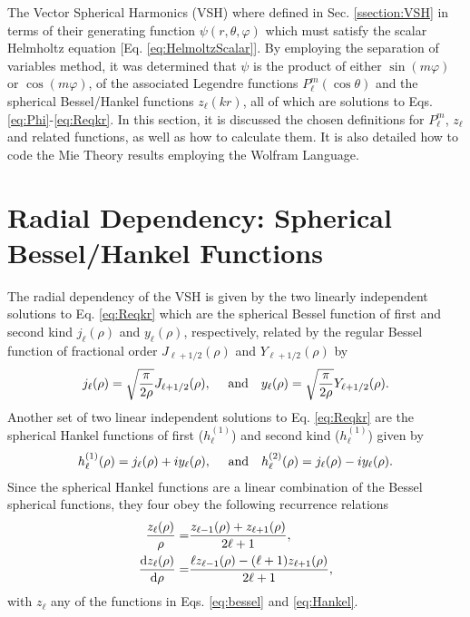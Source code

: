 
The Vector Spherical Harmonics (VSH) where defined in Sec. \ref{ssection:VSH} in terms of their generating function $\psi(r,\theta,\varphi)$ which must satisfy the scalar Helmholtz equation [Eq.  \eqref{eq:HelmoltzScalar}]. By employing the separation of variables method,  it was determined that $\psi$ is the product of either $\sin(m\varphi)$ or $\cos(m\varphi)$, of the associated Legendre functions $P_\ell^m(\cos\theta)$ and the spherical Bessel/Hankel functions $z_\ell(kr)$, all of which are solutions to Eqs. \eqref{eq:Phi}-\eqref{eq:Reqkr}. In this section, it is discussed the chosen definitions for $P_\ell^m$, $z_\ell$ and related functions, as well as how to calculate them. It is also detailed how to code the Mie Theory results employing the Wolfram Language.

\section*{Radial Dependency: Spherical Bessel/Hankel Functions}

The radial dependency of the VSH is given by the two linearly independent solutions to Eq. \eqref{eq:Reqkr} which are the spherical Bessel function of first and second kind $j_\ell(\rho)$ and $y_\ell(\rho)$, respectively, related by the regular Bessel function of fractional order $J_{\ell+1/2}(\rho)$ and  $Y_{\ell+1/2}(\rho)$ by
%
\begin{align}
j_\ell(\rho) = \sqrt{\frac{\pi}{2 \rho}}J_{\ell+1/2}(\rho),\qqtext{ and} 
y_\ell(\rho) = \sqrt{\frac{\pi}{2\rho}}Y_{\ell+1/2}(\rho).
\label{eq:bessel}
\end{align}
%
Another set of two linear independent solutions to  Eq. \eqref{eq:Reqkr} are the spherical Hankel functions  of first ($h^{(1)}_\ell$)  and second kind ($h^{(1)}_\ell$) given by
\begin{align}
h^{(1)}_\ell(\rho) = j_\ell(\rho) + i y_\ell(\rho),\qqtext{ and} 
h^{(2)}_\ell(\rho) = j_\ell(\rho) - i y_\ell(\rho).
\label{eq:Hankel}
\end{align}
%
Since the spherical Hankel functions are a linear combination of the Bessel spherical functions, they four obey the following recurrence relations
%
\begin{align}
\frac{z_\ell(\rho)}{\rho} =& \frac{z_{\ell-1}(\rho) + z_{\ell+1}(\rho)}{2\ell + 1},
\label{eq:recBessel1}\\
\dv{z_\ell(\rho)}{\rho} =& \frac{\ell z_{\ell-1}(\rho) - (\ell+1)z_{\ell+1}(\rho)}{2\ell + 1} ,
\label{eq:recBessel2}
\end{align}
%
with $z_\ell$ any of the functions in Eqs. \eqref{eq:bessel} and \eqref{eq:Hankel}.


